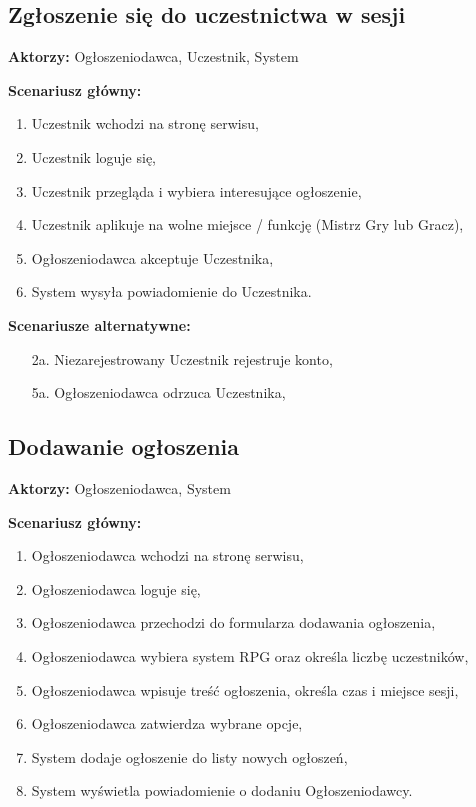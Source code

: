 
\subsection{Zgłoszenie się do uczestnictwa w sesji}

\textbf{Aktorzy:} Ogłoszeniodawca, Uczestnik, System

\textbf{Scenariusz główny:}
	\begin{enumerate}
	\item Uczestnik wchodzi na stronę serwisu,
	\item Uczestnik loguje się,
	\item Uczestnik przegląda i wybiera interesujące ogłoszenie,
	\item Uczestnik aplikuje na wolne miejsce / funkcję (Mistrz Gry lub Gracz),
	\item Ogłoszeniodawca akceptuje Uczestnika,
	\item System wysyła powiadomienie do Uczestnika.
	\end{enumerate}

\textbf{Scenariusze alternatywne:}
	\begin{enumerate}
	\item[2a.] Niezarejestrowany Uczestnik rejestruje konto,
	\item[5a.] Ogłoszeniodawca odrzuca Uczestnika,
	\end{enumerate}

\subsection{Dodawanie ogłoszenia}

\textbf{Aktorzy:} Ogłoszeniodawca, System

\textbf{Scenariusz główny:}
	\begin{enumerate}
	\item Ogłoszeniodawca wchodzi na stronę serwisu,
	\item Ogłoszeniodawca loguje się,
	\item Ogłoszeniodawca przechodzi do formularza dodawania ogłoszenia,
	\item Ogłoszeniodawca wybiera system RPG oraz określa liczbę uczestników,
	\item Ogłoszeniodawca wpisuje treść ogłoszenia, określa czas i miejsce sesji,
	\item Ogłoszeniodawca zatwierdza wybrane opcje,
	\item System dodaje ogłoszenie do listy nowych ogłoszeń,
	\item System wyświetla powiadomienie o dodaniu Ogłoszeniodawcy.
	\end{enumerate}


